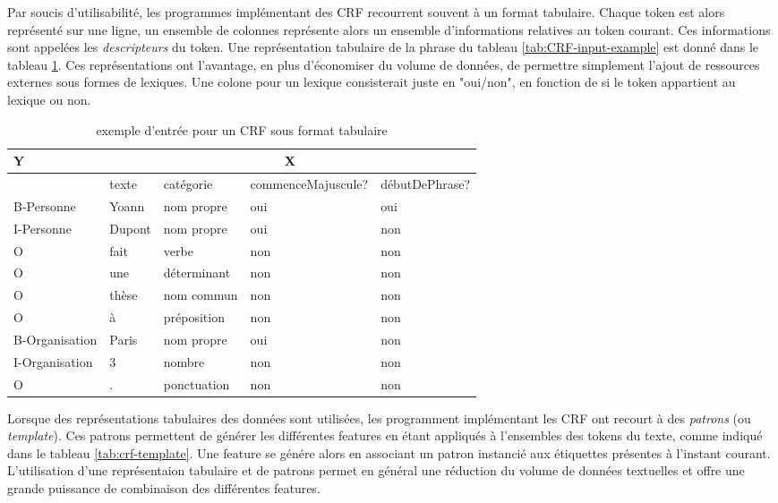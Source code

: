 \documentclass[PhD-Yoann-Dupont.tex]{subfiles}
\begin{document}
Par soucis d'utilisabilité, les programmes implémentant des CRF recourrent souvent à un format tabulaire. Chaque token est alors représenté sur une ligne, un ensemble de colonnes représente alors un ensemble d'informations relatives au token courant. Ces informations sont appelées les \emph{descripteurs} du token. Une représentation tabulaire de la phrase du tableau \ref{tab:CRF-input-example} est donné dans le tableau \ref{tab:CRF-input-tabular}. Ces représentations ont l'avantage, en plus d'économiser du volume de données, de permettre simplement l'ajout de ressources externes sous formes de lexiques. Une colone pour un lexique consisterait juste en "oui/non", en fonction de si le token appartient au lexique ou non.

\begin{table}[ht!]
\begin{tabular}{|l|l|l|l|l|}
\hline
Y              & \multicolumn{4}{c|}{X} \\
\hline
               & texte & catégorie & commenceMajuscule? & débutDePhrase? \\
\cline{2-5}
B-Personne     & Yoann & nom propre & oui & oui \\
I-Personne     & Dupont & nom propre & oui & non \\
O              & fait & verbe & non & non \\
O              & une & déterminant & non & non \\
O              & thèse & nom commun & non & non \\
O              & à & préposition & non & non \\
B-Organisation & Paris & nom propre & oui & non \\
I-Organisation & 3 & nombre & non & non \\
O              & . & ponctuation & non & non \\
\hline
\end{tabular}
\caption{exemple d'entrée pour un CRF sous format tabulaire}
\label{tab:CRF-input-tabular}
\end{table}

Lorsque des représentations tabulaires des données sont utilisées, les programment implémentant les CRF ont recourt à des \emph{patrons} (ou \emph{template}). Ces patrons permettent de générer les différentes features en étant appliqués à l'ensembles des tokens du texte, comme indiqué dans le tableau \ref{tab:crf-template}. Une feature se génére alors en associant un patron instancié aux étiquettes présentes à l'instant courant. L'utilisation d'une représentaion tabulaire et de patrons permet en général une réduction du volume de données textuelles et offre une grande puissance de combinaison des différentes features.
\end{document}
